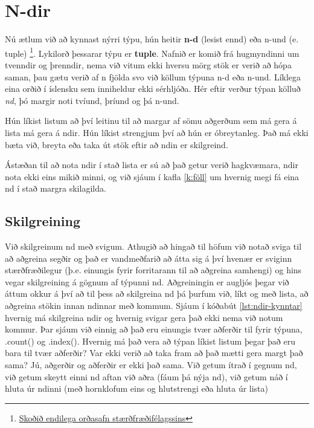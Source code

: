 
\chapter{N-dir}\label{k:ndir}
Nú ætlum við að kynnast nýrri týpu, hún heitir \textbf{n-d} (lesist ennd) eða n-und (e. tuple) \footnote{\href{http://stæ.is/os}{Skoðið endilega orðasafn stærðfræðifélagssins}}.
Lykilorð þessarar týpu er \textbf{tuple}.
Nafnið er komið frá hugmyndinni um tvenndir og þrenndir, nema við vitum ekki hversu mörg stök er verið að hópa saman, þau gætu verið af n fjölda svo við köllum týpuna n-d eða n-und.
Líklega eina orðið í íslensku sem inniheldur ekki sérhljóða.
Hér eftir verður týpan kölluð \emph{nd}, þó margir noti tvíund, þríund og þá n-und.
 
Hún líkist listum að því leitinu til að margar af sömu aðgerðum sem má gera á lista má gera á ndir.
Hún líkist strengjum því að hún er óbreytanleg.
Það má ekki bæta við, breyta eða taka út stök eftir að ndin er skilgreind.

Ástæðan til að nota ndir í stað lista er sú að það getur verið hagkvæmara, ndir nota ekki eins mikið minni, og við sjáum í kafla \ref{k:föll} um hvernig megi fá eina nd í stað margra skilagilda.

\section{Skilgreining}
Við skilgreinum nd með svigum.
Athugið að hingað til höfum við notað sviga til að aðgreina segðir og það er vandmeðfarið að átta sig á því hvenær er sviginn stærðfræðilegur (þ.e. einungis fyrir forritarann til að aðgreina samhengi) og hins vegar skilgreining á gögnum af týpunni nd.
Aðgreiningin er augljós þegar við áttum okkur á því að til þess að skilgreina nd þá þurfum við, líkt og með lista, að aðgreina stökin innan ndinnar með kommum.
Sjáum í kóðabút \ref{lst:ndir-kynntar} hvernig má skilgreina ndir og hvernig svigar gera það ekki nema við notum kommur.
Þar sjáum við einnig að það eru einungis tvær aðferðir til fyrir týpuna, .count() og .index().
Hvernig má það vera að týpan líkist listum þegar það eru bara til tvær aðferðir?
Var ekki verið að taka fram að það mætti gera margt það sama?
Jú, aðgerðir og aðferðir er ekki það sama.
Við getum ítrað í gegnum nd, við getum skeytt einni nd aftan við aðra (fáum þá nýja nd), við getum náð í hluta úr ndinni (með hornklofum eins og hlutstrengi eða hluta úr lista)

